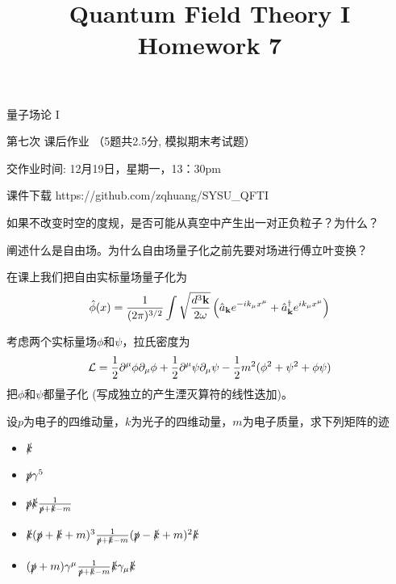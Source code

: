 \documentclass[CJK]{beamer}
\title{Quantum Field Theory I \\ Homework 7}
\author{}
\date{}
\begin{document}
\begin{frame}
 
\begin{center}
\begin{Large}
\bch
量子场论 I 

{\vskip 0.3in}

第七次 课后作业 （5题共2.5分, 模拟期末考试题）

交作业时间: 12月19日，星期一，13：30pm

\ech
\end{Large}
\end{center}

\vskip 0.2in

\bch
课件下载
\ech
https://github.com/zqhuang/SYSU\_QFTI

\end{frame}


\begin{frame}
\bch
如果不改变时空的度规，是否可能从真空中产生出一对正负粒子？为什么？
\ech
\end{frame}

\begin{frame}
\bch
阐述什么是自由场。为什么自由场量子化之前先要对场进行傅立叶变换？
\ech
\end{frame}

\begin{frame}
\bch
在课上我们把自由实标量场量子化为
$$ {\hat{\phi}}(x) = \frac{1}{(2\pi)^{3/2}} \int \sqrt{\frac{d^3{\mathbf{k}}}{2\omega}} \left({\hat{a}}_{{\mathbf{k}}} e^{-ik_\mu x^\mu} + {\hat{a}^\dagger}_{{\mathbf{k}}}e^{ik_\mu x^\mu}\right) $$

考虑两个实标量场$\phi$和$\psi$，拉氏密度为
$${\mathcal{L}} = \frac{1}{2}\partial^\mu\phi\partial_\mu\phi + \frac{1}{2}\partial^\mu\psi\partial_\mu\psi - \frac{1}{2}m^2(\phi^2+\psi^2+\phi\psi) $$
把$\phi$和$\psi$都量子化 (写成独立的产生湮灭算符的线性迭加)。
\ech
\end{frame}


\begin{frame}
\bch
设$p$为电子的四维动量，$k$为光子的四维动量，$m$为电子质量，求下列矩阵的迹
\begin{itemize}
\item{$\slashed{k}$}
\item{$\slashed{p}\gamma^5$}
\item{$\slashed{p}\slashed{k}\frac{1}{\slashed{p}+\slashed{k}-m}$}
\item{$\slashed{k}(\slashed{p}+\slashed{k}+m)^3\frac{1}{\slashed{p}+\slashed{k}-m}(\slashed{p}-\slashed{k}+m)^2\slashed{k}$}
\item{$(\slashed{p}+m)\gamma^\mu\frac{1}{\slashed{p}+\slashed{k} -m}\slashed{k}\gamma_\mu\slashed{k}$}
\end{itemize}
\ech
\end{frame}
\end{document}
